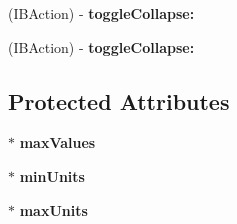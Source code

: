 \begin{DoxyCompactItemize}
\item 
\hypertarget{interface_b_w_split_view_a8db111a6aba214c1b60dd3fa925f624b}{
(\-I\-B\-Action) -\/ {\bfseries toggle\-Collapse\-:}}
\label{interface_b_w_split_view_a8db111a6aba214c1b60dd3fa925f624b}

\item 
\hypertarget{interface_b_w_split_view_a8db111a6aba214c1b60dd3fa925f624b}{
(\-I\-B\-Action) -\/ {\bfseries toggle\-Collapse\-:}}
\label{interface_b_w_split_view_a8db111a6aba214c1b60dd3fa925f624b}

\end{DoxyCompactItemize}
\subsection*{\-Protected \-Attributes}
\begin{DoxyCompactItemize}
\item 
\hypertarget{interface_b_w_split_view_afa5ee397fdc3f844bf96172e83e5ffa6}{
$\ast$ {\bfseries max\-Values}}
\label{interface_b_w_split_view_afa5ee397fdc3f844bf96172e83e5ffa6}

\item 
\hypertarget{interface_b_w_split_view_a75ea384ae77b3daa137d27bf0f4b67dc}{
$\ast$ {\bfseries min\-Units}}
\label{interface_b_w_split_view_a75ea384ae77b3daa137d27bf0f4b67dc}

\item 
\hypertarget{interface_b_w_split_view_aa51d83d075638e90f23f24d2b09adc0b}{
$\ast$ {\bfseries max\-Units}}
\label{interface_b_w_split_view_aa51d83d075638e90f23f24d2b09adc0b}

\end{DoxyCompactItemize}
